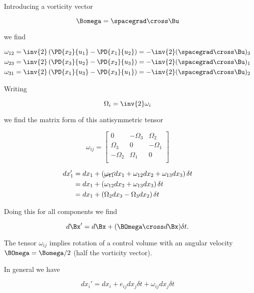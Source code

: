 Introducing a vorticity vector

\begin{equation}\label{eqn:continuumL8:n}
\Bomega = \spacegrad \cross \Bu
\end{equation}

we find

\begin{align}\label{eqn:continuumL8:n}
\omega_{12} &= \inv{2}\left( \PD{x_2}{u_1} -\PD{x_1}{u_2} \right) = - \inv{2} (\spacegrad \cross \Bu)_3 \\
\omega_{23} &= \inv{2}\left( \PD{x_3}{u_2} -\PD{x_2}{u_3} \right) = - \inv{2} (\spacegrad \cross \Bu)_1 \\
\omega_{31} &= \inv{2}\left( \PD{x_1}{u_3} -\PD{x_3}{u_1} \right) = - \inv{2} (\spacegrad \cross \Bu)_2
\end{align}

Writing

\begin{equation}\label{eqn:continuumL8:n}
\Omega_i = \inv{2} \omega_i
\end{equation}

we find the matrix form of this antisymmetric tensor

\begin{equation}\label{eqn:continuumL8:n}
\omega_{ij}
=
\begin{bmatrix}
0 & -\Omega_3 & \Omega_2 \\
\Omega_3 & 0 & -\Omega_1 \\
-\Omega_2 & \Omega_1 & 0 \\
\end{bmatrix}
\end{equation}

\begin{align*}
dx_1'
&= dx_1 + \left( \cancel{\omega_{11}} dx_1 + \omega_{12} dx_2 + \omega_{13} dx_3 \right) \delta t \\
&= dx_1 + \left( \omega_{12} dx_2 + \omega_{13} dx_3 \right) \delta t \\
&= dx_1 + \left( \Omega_2 dx_3 - \Omega_3 dx_2 \right) \delta t
\end{align*}

Doing this for all components we find

\begin{equation}\label{eqn:continuumL8:n}
d\Bx' = d\Bx + (\BOmega \cross d\Bx) \delta t.
\end{equation}

The tensor $\omega_{ij}$ implies rotation of a control volume with an angular velocity $\BOmega = \Bomega/2$ (half the vorticity vector).

In general we have

\begin{equation}\label{eqn:continuumL8:n}
dx_i' = dx_i + e_{ij} dx_j \delta t + \omega_{ij} dx_j \delta t
\end{equation}

\EndArticle
